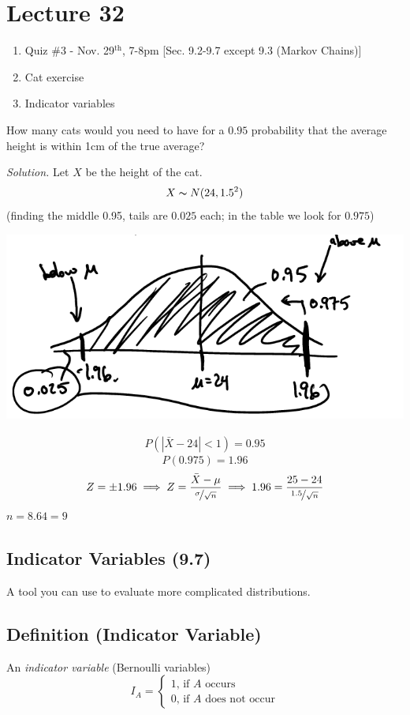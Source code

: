 \section{Lecture 32}
\begin{enumerate}[1.]
    \item Quiz \#3 - Nov. 29$^\text{th}$, 7-8pm [Sec. 9.2-9.7 except 9.3 (Markov Chains)]
    \item Cat exercise
    \item Indicator variables
\end{enumerate}

How many cats would you need to have for a $ 0.95 $ probability
that the average height is within 1cm of the true average? 

\emph{Solution.}
Let $ X $ be the height of the cat.
\[ X \thicksim N(24,1.5^2) \]
(finding the middle 0.95, tails are $ 0.025 $ each; in the table we look
for $ 0.975 $)

\begin{center}
    \includegraphics{catscurve.png}
\end{center}
\begin{align*}
    P\left(\left|\bar{X}-24\right|<1\right)=0.95
\end{align*}
\[ P(0.975)=1.96 \]
\[ Z=\pm 1.96\implies Z=\frac{\bar{X}-\mu}{\nicefrac{\sigma}{\sqrt{n}}}
\implies 1.96=\frac{25-24}{\nicefrac{1.5}{\sqrt{n}}} \]
$ n=8.64=9 $

\subsection{Indicator Variables (9.7)}
A tool you can use to evaluate more complicated distributions.

\begin{defbox}
    \subsection{Definition (Indicator Variable)}
    An \emph{indicator variable} (Bernoulli variables)
    \[ I_A=
    \begin{cases}
        1,\,\text{if $A$ occurs}\\
        0,\,\text{if $A$ does not occur}
    \end{cases} \]
\end{defbox}

